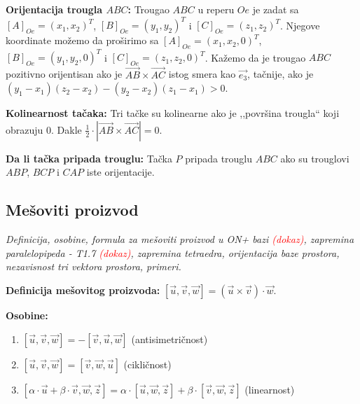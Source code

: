 \documentclass[12pt]{article}
\newcommand{\vek}[1]{\overrightarrow{#1}}
\newcommand{\ocena}[1]{\textcolor{red}{#1}}
\begin{document}
\textbf{Orijentacija trougla $ABC$:} Trougao $ABC$ u reperu $Oe$ je zadat sa
$[A]_{Oe}=(x_1,x_2)^T$, $[B]_{Oe}=(y_1,y_2)^T$ i $[C]_{Oe}=(z_1,z_2)^T$.
Njegove koordinate možemo da proširimo sa
$[A]_{Oe}=(x_1,x_2,0)^T$, $[B]_{Oe}=(y_1,y_2,0)^T$ i $[C]_{Oe}=(z_1,z_2,0)^T$.
Kažemo da je trougao $ABC$ pozitivno orijentisan ako je
$\vek{AB}\times\vek{AC}$ istog smera kao $\vek{e_3}$,
tačnije, ako je $(y_1-x_1)(z_2-x_2)-(y_2-x_2)(z_1-x_1)>0$.
\par

\textbf{Kolinearnost tačaka:} Tri tačke su kolinearne ako je ,,površina
trougla`` koji obrazuju $0$. Dakle
$\displaystyle\frac{1}{2}\cdot|\vek{AB}\times\vek{AC}|=0$.
\par

\textbf{Da li tačka pripada trouglu:} Tačka $P$ pripada trouglu $ABC$ ako su
trouglovi $ABP$, $BCP$ i $CAP$ iste orijentacije.

\subsection{Mešoviti proizvod}
\textit{Definicija, osobine, formula za mešoviti proizvod u ON+ bazi \ocena{(dokaz)},
    zapremina paralelopipeda - T1.7 \ocena{(dokaz)}, zapremina tetraedra, orijentacija
    baze prostora, nezavisnost tri vektora prostora, primeri.}
\par
\vspace*{1cm}

\textbf{Definicija mešovitog proizvoda:} $[\vek{u},\vek{v},\vek{w}]=
    (\vek{u}\times\vek{v})\cdot\vek{w}$.
\par

\textbf{Osobine:}
\begin{enumerate}[label=\textbf{(\arabic*)}]
    \item $[\vek{u},\vek{v},\vek{w}]=-[\vek{v},\vek{u},\vek{w}]$\hspace*{1cm}
          (antisimetričnost)
    \item $[\vek{u},\vek{v},\vek{w}]=[\vek{v},\vek{w},\vek{u}]$\hspace*{1cm}
          (cikličnost)
    \item $[\alpha\cdot\vek{u}+\beta\cdot\vek{v},\vek{w},\vek{z}]=\alpha\cdot
              [\vek{u},\vek{w},\vek{z}]+\beta\cdot[\vek{v},\vek{w},\vek{z}]$
          \hspace*{1cm}(linearnost)
\end{enumerate}
\par
\end{document}
